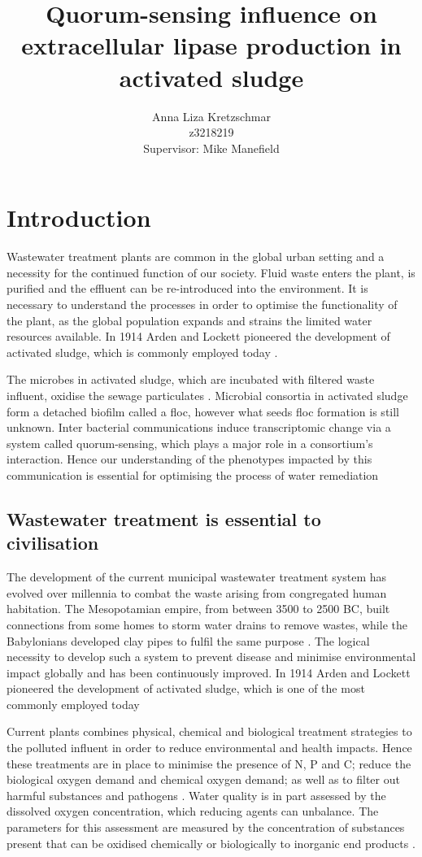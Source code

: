 \documentclass[11pt]{article}
\title{\textbf{Quorum-sensing influence on extracellular lipase production in activated sludge}}
\author{Anna Liza Kretzschmar\\
        z3218219\\
        Supervisor: Mike Manefield}
\date{}
\begin{document}
\maketitle

\section{Introduction}
Wastewater treatment plants are common in the global urban setting and a necessity for the continued function of our society. Fluid waste enters the plant, is purified and the effluent can be re-introduced into the environment. It is necessary to understand the processes in order to optimise the functionality of the plant, as the global population expands and strains the limited water resources available. In 1914 Arden and Lockett pioneered the development of activated sludge, which is commonly employed today \cite{ardern1914experiments}.


The microbes in activated sludge, which are incubated with filtered waste influent, oxidise the sewage particulates \cite{Price_95}. Microbial consortia in activated sludge form a detached biofilm called a floc, however what seeds floc formation is still unknown. Inter bacterial communications induce transcriptomic change via a system called quorum-sensing, which plays a major role in a consortium's interaction\cite{parsek2005sociomicrobiology}. Hence our understanding of the phenotypes impacted by this communication is essential for optimising the process of water remediation \cite{singh2006biofilms}

\subsection{Wastewater treatment is essential to civilisation}
The development of the current municipal wastewater treatment system has evolved over millennia to combat the waste arising from congregated human habitation. The Mesopotamian empire, from between 3500 to 2500 BC, built connections from some homes to storm water drains to remove wastes, while the Babylonians developed clay pipes to fulfil the same purpose \cite{lofrano2010}. The logical necessity to develop such a system to prevent disease and minimise environmental impact globally and has been continuously improved. In 1914 Arden and Lockett pioneered the development of activated sludge, which is one of the most commonly employed today \cite{jenkins2004manual,muchie2010bioremediation}


Current plants combines physical, chemical and biological treatment strategies to the polluted influent in order to reduce environmental and health impacts. Hence these treatments are in place to minimise the presence of N, P and C; reduce the biological oxygen demand and chemical oxygen demand; as well as to filter out harmful substances and pathogens \cite{mayhew1997low}.
Water quality is in part assessed by the dissolved oxygen concentration, which reducing agents can unbalance. The parameters for this assessment are measured by the concentration of substances present that can be oxidised chemically or biologically to inorganic end products \cite{pisarevsky2005chemical}.
\end{document}
